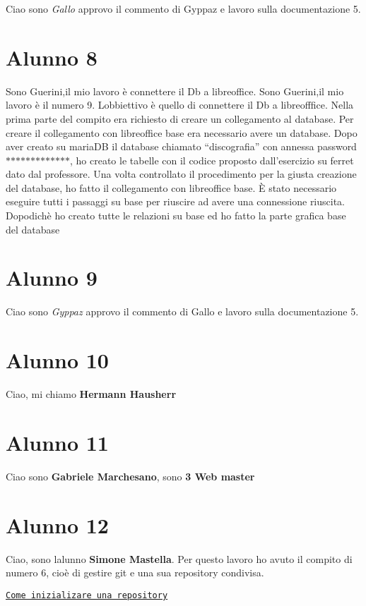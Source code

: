 Ciao sono {\itshape Gallo} approvo il commento di Gyppaz e lavoro sulla documentazione 5. \section*{Alunno 8}

Sono Guerini,il mio lavoro è connettere il Db a libreoffice. Sono Guerini,il mio lavoro è il numero 9. L\textquotesingle{}obbiettivo è quello di connettere il Db a libreofffice. Nella prima parte del compito era richiesto di creare un collegamento al database. Per creare il collegamento con libreoffice base era necessario avere un database. Dopo aver creato su maria\+DB il database chiamato “discografia” con annessa password $\ast$$\ast$$\ast$$\ast$$\ast$$\ast$$\ast$$\ast$$\ast$$\ast$$\ast$$\ast$$\ast$, ho creato le tabelle con il codice proposto dall’esercizio su ferret dato dal professore. Una volta controllato il procedimento per la giusta creazione del database, ho fatto il collegamento con libreoffice base. È stato necessario eseguire tutti i passaggi su base per riuscire ad avere una connessione riuscita. Dopodichè ho creato tutte le relazioni su base ed ho fatto la parte grafica base del database \section*{Alunno 9}

Ciao sono {\itshape Gyppaz} approvo il commento di Gallo e lavoro sulla documentazione 5. \section*{Alunno 10}

Ciao, mi chiamo {\bfseries Hermann Hausherr} \section*{Alunno 11}

Ciao sono {\bfseries Gabriele Marchesano}, sono {\bfseries 3 Web master} \section*{Alunno 12}

Ciao, sono l\textquotesingle{}alunno {\bfseries Simone Mastella}. Per questo lavoro ho avuto il compito di numero 6, cioè di gestire git e una sua repository condivisa.

\href{https://gist.github.com/simonemastella/1792e8dd3cc8a8878825a4d2df676300}{\tt Come inizializare una repository}

